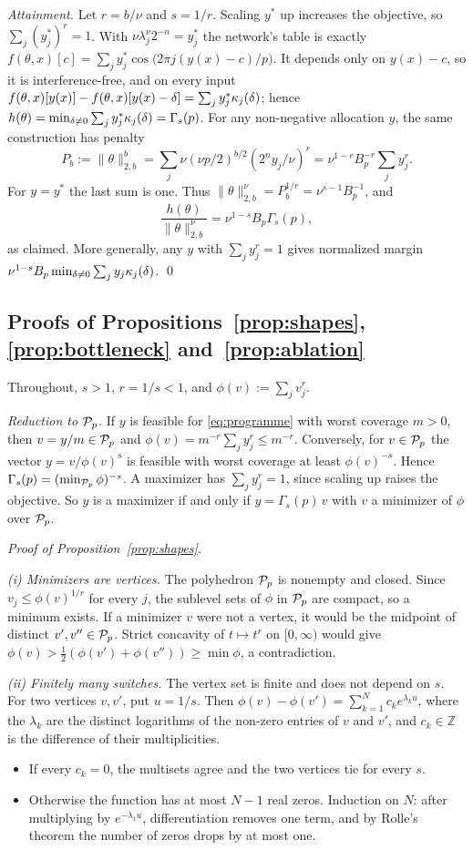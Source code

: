 \emph{Attainment.} Let $r=b/\nu$ and $s=1/r$. Scaling $y^*$ up increases the objective, so $\sum_j(y^*_j)^r=1$. With $\nu\lambda_j^\nu2^{-n}=y^*_j$ the network's table is exactly
$f(\theta,x)[c]=\sum_jy^*_j\cos\big(2\pi j(y(x)-c)/p\big)$. It depends only on $y(x)-c$, so it is interference-free, and on every input $f(\theta,x)[y(x)]-f(\theta,x)[y(x)-\delta]=\sum_jy^*_j\kappa_{j}(\delta)$; hence $h(\theta)=\min_{\delta\neq0}\sum_jy^*_j\kappa_{j}(\delta)=\Gamma_s(p)$. For any non-negative allocation $y$, the same construction has penalty
\[
P_b:=\|\theta\|_{2,b}^b
=\sum_j\nu(\nu p/2)^{b/2}(2^ny_j/\nu)^r
=\nu^{1-r}B_p^{-r}\sum_jy_j^r.
\]
For $y=y^*$ the last sum is one. Thus $\|\theta\|_{2,b}^\nu=P_b^{1/r}=\nu^{s-1}B_p^{-1}$, and
\[
\frac{h(\theta)}{\|\theta\|_{2,b}^\nu}
=\nu^{1-s}B_p\Gamma_s(p),
\]
as claimed. More generally, any $y$ with $\sum_jy_j^r=1$ gives normalized margin $\nu^{1-s}B_p\min_{\delta\neq0}\sum_jy_j\kappa_{j}(\delta)$.
\qed

\subsection{Proofs of Propositions~\ref{prop:shapes}, \ref{prop:bottleneck} and~\ref{prop:ablation}}\label{app:shape}

Throughout, $s>1$, $r=1/s<1$, and $\phi(v):=\sum_jv_j^r$.

\emph{Reduction to $\mathcal{P}_p$.} If $y$ is feasible for \eqref{eq:programme} with worst coverage $m>0$, then $v=y/m\in\mathcal{P}_p$ and $\phi(v)=m^{-r}\sum_jy_j^r\le m^{-r}$. Conversely, for $v\in\mathcal{P}_p$ the vector $y=v/\phi(v)^s$ is feasible with worst coverage at least $\phi(v)^{-s}$. Hence $\Gamma_s(p)=(\min_{\mathcal{P}_p}\phi)^{-s}$. A maximizer has $\sum_jy_j^r=1$, since scaling up raises the objective. So $y$ is a maximizer if and only if $y=\Gamma_s(p)\,v$ with $v$ a minimizer of $\phi$ over $\mathcal{P}_p$.

\emph{Proof of Proposition~\ref{prop:shapes}.}

\emph{(i) Minimizers are vertices.} The polyhedron $\mathcal{P}_p$ is nonempty and closed. Since $v_j\le\phi(v)^{1/r}$ for every $j$, the sublevel sets of $\phi$ in $\mathcal{P}_p$ are compact, so a minimum exists. If a minimizer $v$ were not a vertex, it would be the midpoint of distinct $v',v''\in\mathcal{P}_p$. Strict concavity of $t\mapsto t^r$ on $[0,\infty)$ would give $\phi(v)>\frac12(\phi(v')+\phi(v''))\ge\min\phi$, a contradiction.

\emph{(ii) Finitely many switches.} The vertex set is finite and does not depend on $s$. For two vertices $v,v'$, put $u=1/s$. Then $\phi(v)-\phi(v')=\sum_{k=1}^Nc_ke^{\lambda_ku}$, where the $\lambda_k$ are the distinct logarithms of the non-zero entries of $v$ and $v'$, and $c_k\in\mathbb Z$ is the difference of their multiplicities.
\begin{itemize}
\item If every $c_k=0$, the multisets agree and the two vertices tie for every $s$.
\item Otherwise the function has at most $N-1$ real zeros. Induction on $N$: after multiplying by $e^{-\lambda_1u}$, differentiation removes one term, and by Rolle's theorem the number of zeros drops by at most one.
\end{itemize}

